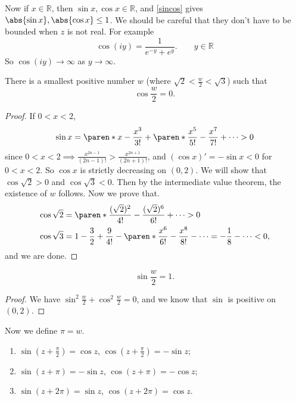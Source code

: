 Now if \(x \in \mathbb{R}\), then \(\sin x, \cos x \in \mathbb{R}\), and \cref{sincos} gives \(\abs{\sin x},\abs{\cos x} \leq 1\). We should be careful that they don't have to be bounded when \(z\) is not real. For example
\[
    \cos(iy) = \frac{1}{e^{-y} + e^y}. \qquad y \in \mathbb{R}
\]
So \(\cos(iy) \to \infty\) as \(y \to \infty \).

\begin{proposition}{}{}
    There is a smallest positive number \(w\) (where \(\sqrt{2} < \frac{w}{2} <\sqrt{3}\)) such that
    \[
        \cos \frac{w}{2} = 0.
    \]
\end{proposition}
\begin{proof}
    If \(0 < x < 2\),
    \[
        \sin x = \paren*{x - \frac{x^3}{3!}} + \paren*{\frac{x^5}{5!} - \frac{x^7}{7!}} + \dots > 0
    \]
    since \(0 < x < 2 \implies \frac{x^{2n - 1}}{(2n-1)!} > \frac{x^{2n + 1}}{(2n + 1)!}\), and \((\cos x)' = -\sin x < 0\) for \(0 < x < 2\). So \(\cos x\) is strictly decreasing on \((0,2)\). We will show that \(\cos \sqrt{2} >0\) and \(\cos \sqrt{3} < 0\). Then by the intermediate value theorem, the existence of \(w\) follows. Now we prove that.
    \begin{align*}
        \cos \sqrt{2} &= \paren*{\frac{(\sqrt{2})^2}{4!} - \frac{(\sqrt{2})^6}{6!}} + \dots > 0\\
        \cos \sqrt{3} &= 1 - \frac{3}{2} + \frac{9}{4!} - \paren*{\frac{x^6}{6!}-\frac{x^8}{8!}} - \dots = -\frac{1}{8} - \dots < 0,
    \end{align*}
    and we are done.
\end{proof}
\begin{corollary}{}{}
    \[
        \sin \frac{w}{2} = 1.
    \]
\end{corollary}
\begin{proof}
    We have \(\sin^2 \frac{w}{2} + \cos^2 \frac{w}{2} = 0\), and we know that \(\sin \) is positive on \((0,2)\).
\end{proof}
Now we define \(\pi = w\).
\begin{theorem}{}{}
    \begin{enumerate}
        \item \(\sin(z + \frac{\pi}{2}) = \cos z\), \(\cos(z + \frac{\pi}{2}) = - \sin z\);
        \item \(\sin(z + \pi) = -\sin z\), \(\cos(z + \pi) = - \cos z\);
        \item \(\sin(z + 2\pi) = \sin z\), \(\cos(z + 2\pi) =  \cos z\).
    \end{enumerate}
\end{theorem}
